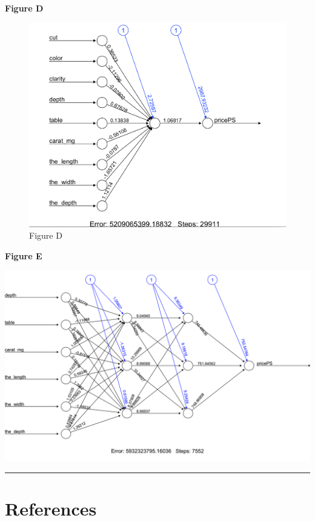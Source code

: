 \documentclass[
]{article}
\begin{document}
\textbf{Figure D}

\begin{figure}

{\centering \includegraphics[width=0.8\linewidth]{Images/First_Neural_Network} 

}

\caption{Figure D}\label{fig:unnamed-chunk-6}
\end{figure}

\textbf{Figure E}

\begin{center}\includegraphics[width=0.8\linewidth]{Images/Neural_Netowork_2HL_3Nodes} \end{center}

\begin{center}\rule{0.5\linewidth}{0.5pt}\end{center}

\newpage

\hypertarget{references}{%
\section{References}\label{references}}
\end{document}
